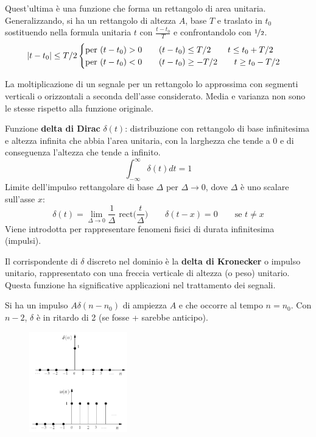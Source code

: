 Quest'ultima è una funzione che forma un rettangolo di area unitaria. Generalizzando, si ha un rettangolo di altezza $A$, base $T$ e traslato in $t_0$ sostituendo nella formula unitaria $t$ con $\frac{t - t_0}{T}$ e confrontandolo con $\nicefrac{1}{2}$.
$$\left|t - t_0\right| \leq T / 2 \begin{cases}
\text{per } (t - t_0) > 0 \qquad (t - t_0) \leq T / 2 \qquad t \leq t_0 + T / 2 \\
\text{per } (t - t_0) < 0 \qquad (t - t_0) \geq -T / 2 \qquad t \geq t_0 - T / 2
\end{cases}$$

La moltiplicazione di un segnale per un rettangolo lo approssima con segmenti verticali o orizzontali a seconda dell'asse considerato. Media e varianza non sono le stesse rispetto alla funzione originale.

Funzione \textbf{delta di Dirac} $\delta(t)$: distribuzione con rettangolo di base infinitesima e altezza infinita che abbia l'area unitaria, con la larghezza che tende a 0 e di conseguenza l'altezza che tende a infinito. 
$$\int_{-\infty}^{\infty} \delta(t) dt = 1$$
Limite dell'impulso rettangolare di base $\Delta$ per $\Delta \rightarrow 0$, dove $\Delta$ è uno scalare sull'asse $x$: 
$$\delta(t) = \lim\limits_{\Delta \rightarrow 0} \frac{1}{\Delta} \text{ rect}\Big(\frac{t}{\Delta}\Big) \qquad \delta(t - x) = 0 \qquad \text{se } t \neq x$$
Viene introdotta per rappresentare fenomeni fisici di durata infinitesima (impulsi).

Il corrispondente di $\delta$ discreto nel dominio è la \textbf{delta di Kronecker} o impulso unitario, rappresentato con una freccia verticale di altezza (o peso) unitario. Questa funzione ha significative applicazioni nel trattamento dei segnali. 

Si ha un impulso $A\delta(n - n_0)$ di ampiezza $A$ e che occorre al tempo $n = n_0$. Con $n - 2$, $\delta$ è in ritardo di 2 (se fosse + sarebbe anticipo).

\begin{figure}
	\begin{center}
		\includegraphics[width=0.38\textwidth]{Lezioni/Immagini/gradinodiscreto}
	\end{center}
	\vspace{-80pt}
\end{figure}

